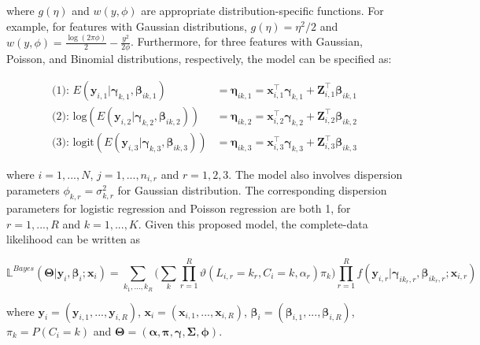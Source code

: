where $g(\eta)$ and $w(y,\phi)$ are appropriate distribution-specific functions. For example, for features with Gaussian distributions, $g(\eta) = \eta^2/2$ and $w(y,\phi) = \frac{\log(2\pi\phi)}{2} - \frac{y^2}{2\phi}$. Furthermore, for three features with Gaussian, Poisson, and Binomial distributions, respectively, the model can be specified as: 

\begin{align*}

  \text{(1): }  E(\boldsymbol{y}_{i,1}|\boldsymbol{\gamma}_{k,1}, \boldsymbol{\beta}_{ik,1}) & = \boldsymbol{\eta}_{ik,1}  =   \boldsymbol{x}_{i,1}^\top\boldsymbol{\gamma}_{k,1} +  \boldsymbol{Z}_{i,1}^\top\boldsymbol{\beta}_{ik,1}  \\

  \text{(2): }    \text{log}(E(\boldsymbol{y}_{i,2}|\boldsymbol{\gamma}_{k,2}, \boldsymbol{\beta}_{ik,2})) & = \boldsymbol{\eta}_{ik,2}  =  \boldsymbol{x}_{i,2}^\top\boldsymbol{\gamma}_{k,2} +  \boldsymbol{Z}_{i,2}^\top\boldsymbol{\beta}_{ik,2} \\

  \text{(3): }   \text{logit}(E(\boldsymbol{y}_{i,3}|\boldsymbol{\gamma}_{k,3},\boldsymbol{\beta}_{ik,3})) & =  \boldsymbol{\eta}_{ik,3} = \boldsymbol{x}_{i,3}^\top\boldsymbol{\gamma}_{k,3} +  \boldsymbol{Z}_{i,3}^\top\boldsymbol{\beta}_{ik,3}

\end{align*}

where $i=1,...,N$, $j=1,...,n_{i,r}$ and $r=1,2,3$. The model also involves dispersion parameters $\phi_{k,r} = \sigma^2_{k,r}$ for Gaussian distribution. The corresponding dispersion parameters for logistic regression and Poisson regression are both 1, for $r=1,...,R$ and $k=1,...,K$. Given this proposed model, the complete-data likelihood can be written as

\begin{equation}

 \mathbb{L}^{Bayes}(\boldsymbol{\Theta}| \boldsymbol{y}_i,\boldsymbol{\beta}_i; \boldsymbol{x}_{i})   =  \sum_{k_1,...,k_R}   \bigg(\sum_k \prod_{r=1}^R \vartheta(L_{i,r}=k_r,C_i=k,\alpha_r) \pi_k \bigg)  \prod_{r=1}^R f(\boldsymbol{y}_{i,r}|\boldsymbol{\gamma}_{ik_r,r},\boldsymbol{\beta}_{ik_r,r}; \boldsymbol{x}_{i,r}) 

\end{equation}

where $\boldsymbol{y}_i = (\boldsymbol{y}_{i,1},...,\boldsymbol{y}_{i,R})$, $\boldsymbol{x}_i = (\boldsymbol{x}_{i,1},...,\boldsymbol{x}_{i,R})$, $\boldsymbol{\beta}_i = (\boldsymbol{\beta}_{i,1},..., \boldsymbol{\beta}_{i,R})$, $\pi_k=P(C_i = k)$ and $\boldsymbol{\Theta}= (\boldsymbol{\alpha}, \boldsymbol{\pi},\boldsymbol{\gamma},\boldsymbol{\Sigma},\boldsymbol{\phi})$.

